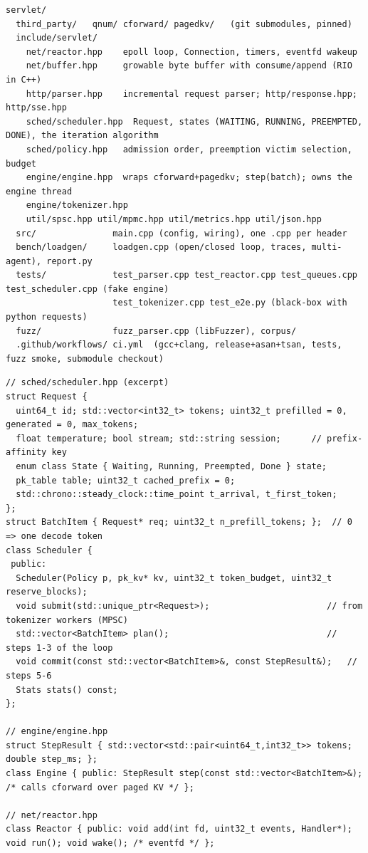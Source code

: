 \begin{lstlisting}[style=plain]
servlet/
  third_party/   qnum/ cforward/ pagedkv/   (git submodules, pinned)
  include/servlet/
    net/reactor.hpp    epoll loop, Connection, timers, eventfd wakeup
    net/buffer.hpp     growable byte buffer with consume/append (RIO in C++)
    http/parser.hpp    incremental request parser; http/response.hpp; http/sse.hpp
    sched/scheduler.hpp  Request, states (WAITING, RUNNING, PREEMPTED, DONE), the iteration algorithm
    sched/policy.hpp   admission order, preemption victim selection, budget
    engine/engine.hpp  wraps cforward+pagedkv; step(batch); owns the engine thread
    engine/tokenizer.hpp
    util/spsc.hpp util/mpmc.hpp util/metrics.hpp util/json.hpp
  src/               main.cpp (config, wiring), one .cpp per header
  bench/loadgen/     loadgen.cpp (open/closed loop, traces, multi-agent), report.py
  tests/             test_parser.cpp test_reactor.cpp test_queues.cpp test_scheduler.cpp (fake engine)
                     test_tokenizer.cpp test_e2e.py (black-box with python requests)
  fuzz/              fuzz_parser.cpp (libFuzzer), corpus/
  .github/workflows/ ci.yml  (gcc+clang, release+asan+tsan, tests, fuzz smoke, submodule checkout)
\end{lstlisting}

\begin{lstlisting}[style=cpp]
// sched/scheduler.hpp (excerpt)
struct Request {
  uint64_t id; std::vector<int32_t> tokens; uint32_t prefilled = 0, generated = 0, max_tokens;
  float temperature; bool stream; std::string session;      // prefix-affinity key
  enum class State { Waiting, Running, Preempted, Done } state;
  pk_table table; uint32_t cached_prefix = 0;
  std::chrono::steady_clock::time_point t_arrival, t_first_token;
};
struct BatchItem { Request* req; uint32_t n_prefill_tokens; };  // 0 => one decode token
class Scheduler {
 public:
  Scheduler(Policy p, pk_kv* kv, uint32_t token_budget, uint32_t reserve_blocks);
  void submit(std::unique_ptr<Request>);                       // from tokenizer workers (MPSC)
  std::vector<BatchItem> plan();                               // steps 1-3 of the loop
  void commit(const std::vector<BatchItem>&, const StepResult&);   // steps 5-6
  Stats stats() const;
};

// engine/engine.hpp
struct StepResult { std::vector<std::pair<uint64_t,int32_t>> tokens; double step_ms; };
class Engine { public: StepResult step(const std::vector<BatchItem>&); /* calls cforward over paged KV */ };

// net/reactor.hpp
class Reactor { public: void add(int fd, uint32_t events, Handler*); void run(); void wake(); /* eventfd */ };
\end{lstlisting}

